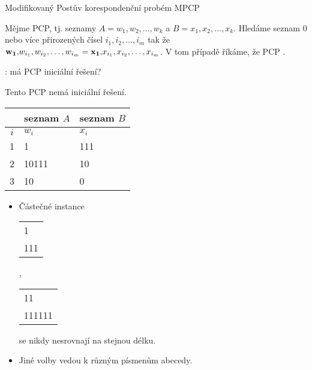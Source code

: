     \begin{frame}{Modifikovaný Postův korespondenční probém MPCP}
    \begin{definition}
    Mějme PCP, tj. seznamy $A=w_1,w_2,\ldots, w_k$ a $B=x_1,x_2,\ldots, x_k$. Hledáme seznam 0 nebo více přirozených čísel  ${i_1}, {i_2}, \ldots, {i_m}$ tak že ${\bf w_1,}w_{i_1}, w_{i_2}, \ldots, w_{i_m}={\bf x_1,}x_{i_1}, x_{i_2}, \ldots, x_{i_m} $. V tom případě říkáme, že PCP .
    
    : má PCP iniciální řešení?
    \end{definition}
    \begin{minipage}{0.37\textwidth}
    \begin{example}
    Tento PCP nemá iniciální řešení.\\
    \begin{tabular}{c | l | l}
     & seznam $A$ & seznam $B$\\
    \hline
    $i$ & $w_i$ & $x_i$ \\
    \hline
    1 & 1 & 111\\
    2 & 10111 & 10\\
    3 & 10 & 0 
    \end{tabular}
    \end{example}
    \end{minipage}\hfill
    \begin{minipage}{0.57\textwidth}
    \begin{proofm}{}
    \begin{itemize}
        \item  Částečné instance 
    \begin{tabular}{l}1\\111\end{tabular}, 
    \begin{tabular}{l}11\\111111\end{tabular} se nikdy nesrovnají na stejnou délku. 
    \item Jiné volby vedou k různým písmenům abecedy.
    \end{itemize}
    \end{proofm}
    \end{minipage}
    \end{frame}
    
